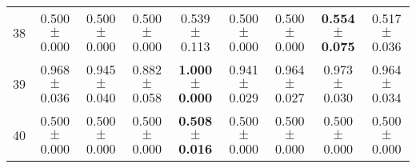\begin{table}[!ht]
{\begin{tabular}{r c c c c c c c c}
38 & 0.500 $\pm$ 0.000 & 0.500 $\pm$ 0.000 & 0.500 $\pm$ 0.000 & 0.539 $\pm$ 0.113 & 0.500 $\pm$ 0.000 & 0.500 $\pm$ 0.000 & \textbf{0.554 $\pm$ 0.075} & 0.517 $\pm$ 0.036 \\
39 & 0.968 $\pm$ 0.036 & 0.945 $\pm$ 0.040 & 0.882 $\pm$ 0.058 & \textbf{1.000 $\pm$ 0.000} & 0.941 $\pm$ 0.029 & 0.964 $\pm$ 0.027 & 0.973 $\pm$ 0.030 & 0.964 $\pm$ 0.034 \\
40 & 0.500 $\pm$ 0.000 & 0.500 $\pm$ 0.000 & 0.500 $\pm$ 0.000 & \textbf{0.508 $\pm$ 0.016} & 0.500 $\pm$ 0.000 & 0.500 $\pm$ 0.000 & 0.500 $\pm$ 0.000 & 0.500 $\pm$ 0.000 \\
\end{tabular}}
\end{table}
